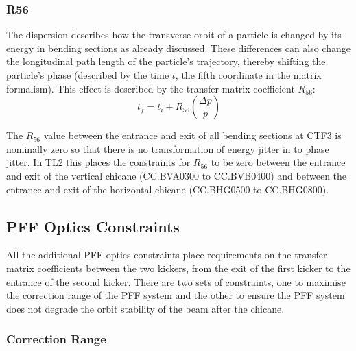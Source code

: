 \subsubsection{R56}

The dispersion describes how the transverse orbit of a particle is changed by its energy in bending sections as already discussed. These differences can also change the longitudinal path length of the particle's trajectory, thereby shifting the particle's phase (described by the time \(t\), the fifth coordinate in the matrix formalism). This effect is described by the transfer matrix coefficient \(R_{56}\):
\begin{equation}
t_{f} = t_{i} + R_{56}\left(\frac{\Delta p}{p}\right)
\end{equation}

The \(R_{56}\) value between the entrance and exit of all bending sections at CTF3 is nominally zero so that there is no transformation of energy jitter in to phase jitter. In TL2 this places the constraints for \(R_{56}\) to be zero between the entrance and exit of the vertical chicane (CC.BVA0300 to CC.BVB0400) and between the entrance and exit of the horizontal chicane (CC.BHG0500 to CC.BHG0800).

\subsection{PFF Optics Constraints}
\label{ss:pffOpticsReqs}

All the additional PFF optics constraints place requirements on the transfer matrix coefficients between the two kickers, from the exit of the first kicker to the entrance of the second kicker. There are two sets of constraints, one to maximise the correction range of the PFF system and the other to ensure the PFF system does not degrade the orbit stability of the beam after the chicane.

\subsubsection{Correction Range}

